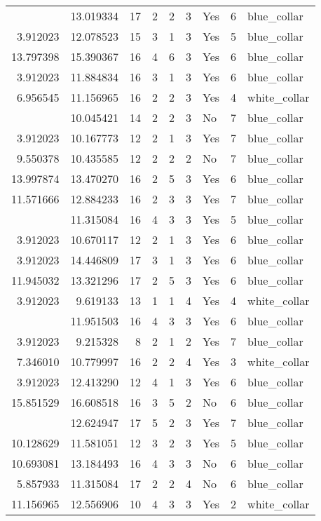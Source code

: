\documentclass[
]{article}
\begin{document}
\begin{longtable}[t]{rrrrrllrl}
\addlinespace
9.854822 & 13.019334 & 17 & 2 & 2 & 3 & Yes & 6 & blue\_collar\\
3.912023 & 12.078523 & 15 & 3 & 1 & 3 & Yes & 5 & blue\_collar\\
13.797398 & 15.390367 & 16 & 4 & 6 & 3 & Yes & 6 & blue\_collar\\
3.912023 & 11.884834 & 16 & 3 & 1 & 3 & Yes & 6 & blue\_collar\\
6.956545 & 11.156965 & 16 & 2 & 2 & 3 & Yes & 4 & white\_collar\\
\addlinespace
6.309918 & 10.045421 & 14 & 2 & 2 & 3 & No & 7 & blue\_collar\\
3.912023 & 10.167773 & 12 & 2 & 1 & 3 & Yes & 7 & blue\_collar\\
9.550378 & 10.435585 & 12 & 2 & 2 & 2 & No & 7 & blue\_collar\\
13.997874 & 13.470270 & 16 & 2 & 5 & 3 & Yes & 6 & blue\_collar\\
11.571666 & 12.884233 & 16 & 2 & 3 & 3 & Yes & 7 & blue\_collar\\
\addlinespace
5.857933 & 11.315084 & 16 & 4 & 3 & 3 & Yes & 5 & blue\_collar\\
3.912023 & 10.670117 & 12 & 2 & 1 & 3 & Yes & 6 & blue\_collar\\
3.912023 & 14.446809 & 17 & 3 & 1 & 3 & Yes & 6 & blue\_collar\\
11.945032 & 13.321296 & 17 & 2 & 5 & 3 & Yes & 6 & blue\_collar\\
3.912023 & 9.619133 & 13 & 1 & 1 & 4 & Yes & 4 & white\_collar\\
\addlinespace
8.306472 & 11.951503 & 16 & 4 & 3 & 3 & Yes & 6 & blue\_collar\\
3.912023 & 9.215328 & 8 & 2 & 1 & 2 & Yes & 7 & blue\_collar\\
7.346010 & 10.779997 & 16 & 2 & 2 & 4 & Yes & 3 & white\_collar\\
3.912023 & 12.413290 & 12 & 4 & 1 & 3 & Yes & 6 & blue\_collar\\
15.851529 & 16.608518 & 16 & 3 & 5 & 2 & No & 6 & blue\_collar\\
\addlinespace
8.022897 & 12.624947 & 17 & 5 & 2 & 3 & Yes & 7 & blue\_collar\\
10.128629 & 11.581051 & 12 & 3 & 2 & 3 & Yes & 5 & blue\_collar\\
10.693081 & 13.184493 & 16 & 4 & 3 & 3 & No & 6 & blue\_collar\\
5.857933 & 11.315084 & 17 & 2 & 2 & 4 & No & 6 & blue\_collar\\
11.156965 & 12.556906 & 10 & 4 & 3 & 3 & Yes & 2 & white\_collar\\

\end{longtable}
\end{document}
